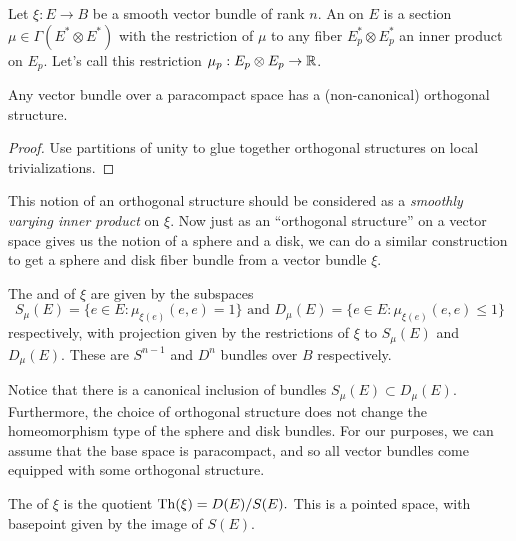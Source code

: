 \documentclass{article}
\begin{document}
\begin{definition}
  Let $\xi : E \to B$ be a smooth vector bundle of rank $n$. An  on $E$ is a section $\mu \in \Gamma(E^*\otimes E^*)$ with the restriction of $\mu$ to any fiber $E_p^*\otimes E_p^*$ an inner product on $E_p$. Let's call this restriction $\mu_p : E_p\otimes E_p \to \mathbb{R}$.
\end{definition}

\begin{proposition}
  Any vector bundle over a paracompact space has a (non-canonical) orthogonal structure.
\end{proposition}

\begin{proof}
  Use partitions of unity to glue together orthogonal structures on local trivializations.
\end{proof}

This notion of an orthogonal structure should be considered as a \emph{smoothly varying inner product} on $\xi$. Now just as an ``orthogonal structure'' on a vector space gives us the notion of a sphere and a disk, we can do a similar construction to get a sphere and disk fiber bundle from a vector bundle $\xi$.

\begin{definition}
  The  and  of $\xi$ are given by the subspaces
  \[
    S_\mu(E) = \{ e\in E : \mu_{\xi(e)}(e, e) = 1 \} \textrm{ and }D_\mu(E) = \{ e\in E : \mu_{\xi(e)}(e, e) \leq 1\}
  \]
  respectively, with projection given by the restrictions of $\xi$ to $S_\mu(E)$ and $D_\mu(E)$. These are $S^{n-1}$ and $D^n$ bundles over $B$ respectively.
\end{definition}

Notice that there is a canonical inclusion of bundles $S_\mu(E) \subset D_\mu(E)$. Furthermore, the choice of orthogonal structure does not change the homeomorphism type of the sphere and disk bundles. For our purposes, we can assume that the base space is paracompact, and so all vector bundles come equipped with some orthogonal structure.

\begin{definition}
  The  of $\xi$ is the quotient $\mathrm{Th}(\xi) = D(E) / S(E).$ This is a pointed space, with basepoint given by the image of $S(E)$.
\end{definition}
\end{document}

